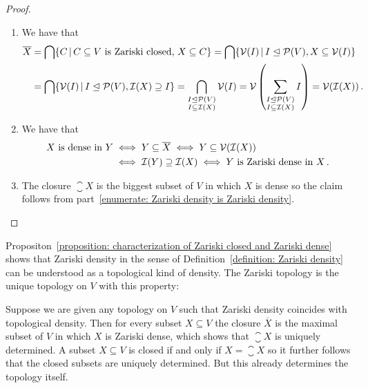 \begin{proof}
  \leavevmode
  \begin{enumerate}
    \item
      We have that
      \begin{align*}
            \closure{X}
        &=  \bigcap \{ C \suchthat \text{$C \subseteq V$ is Zariski closed, $X \subseteq C$} \}
         =  \bigcap \{ \mc{V}(I) \suchthat I \idealeq \mc{P}(V), X \subseteq \mc{V}(I) \} \\
        &=  \bigcap \{ \mc{V}(I) \suchthat I \idealeq \mc{P}(V), \mc{I}(X) \supseteq I \}
         =  \bigcap_{\substack{I \idealeq \mc{P}(V) \\ I \subseteq \mc{I}(X)}} \mc{V}(I)
         =  \mc{V}\left( \sum_{\substack{I \idealeq \mc{P}(V) \\ I \subseteq \mc{I}(X)}} I \right)
         =  \mc{V}(\mc{I}(X)) \,.
      \end{align*}
    \item
      We have that
      \begin{align*}
              \text{$X$ is dense in $Y$}
        &\iff Y \subseteq \overline{X}
         \iff Y \subseteq \mathcal{V}(\mathcal{I}(X)) \\
        &\iff \mathcal{I}(Y) \supseteq \mathcal{I}(X)
         \iff \text{$Y$ is Zariski dense in $X$} \,.
      \end{align*}
    \item
      The closure $\closure{X}$ is the biggest subset of $V$ in which $X$ is dense so the claim follows from part~\ref*{enumerate: Zariski density is Zariski density}.
    \qedhere
  \end{enumerate}
\end{proof}


\begin{remark}
  Propositon~\ref{proposition: characterization of Zariski closed and Zariski dense} shows that Zariski density in the sense of Definition~\ref{definition: Zariski density} can be understood as a topological kind of density.
  The Zariski topology is the unique topology on $V$ with this property:
  
  Suppose we are given any topology on $V$ such that Zariski density coincides with topological density.
  Then for every subset $X \subseteq V$ the closure $\overline{X}$ is the maximal subset of $V$ in which $X$ is Zariski dense, which shows that $\closure{X}$ is uniquely determined.
  A subset $X \subseteq V$ is closed if and only if $X = \closure{X}$ so it further follows that the closed subsets are uniquely determined.
  But this already determines the topology itself.
\end{remark}


